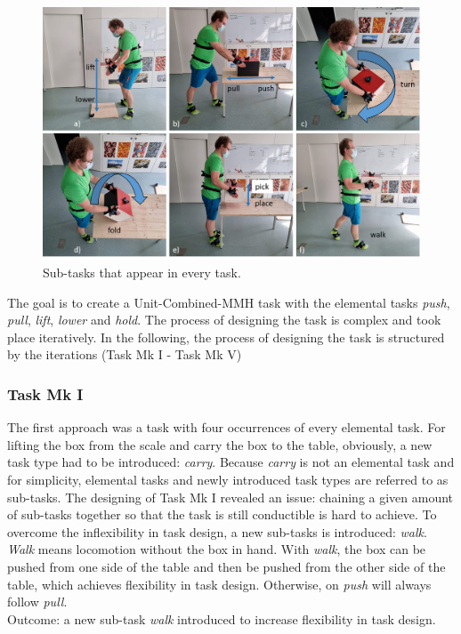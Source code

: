 \begin{figure}[H]
	\centering
	\includegraphics[width=\textwidth]{figures/sub-tasks.png}
	\caption[Description of sub-tasks]{Sub-tasks that appear in every task.}
	\label{fig:sub-tasks}
\end{figure}

The goal is to create a Unit-Combined-MMH task with the elemental tasks \textit{push}, \textit{pull}, \textit{lift}, \textit{lower} and \textit{hold}. The process of designing the task is complex and took place iteratively. In the following, the process of designing the task is structured by the iterations (Task Mk I - Task Mk V)\\

\subsubsection{Task Mk I}
The first approach was a task with four occurrences of every elemental task. For lifting the box from the scale and carry the box to the table, obviously, a new task type had to be introduced: \textit{carry}. Because \textit{carry} is not an elemental task and for simplicity, elemental tasks and newly introduced task types are referred to as sub-tasks. The designing of Task Mk I revealed an issue: chaining a given amount of sub-tasks together so that the task is still conductible is hard to achieve. To overcome the inflexibility in task design, a new sub-tasks is introduced: \textit{walk}. \textit{Walk} means locomotion without the box in hand. With \textit{walk}, the box can be pushed from one side of the table and then be pushed from the other side of the table, which achieves flexibility in task design. Otherwise, on \textit{push} will always follow \textit{pull}.\\
Outcome: a new sub-task \textit{walk} introduced to increase flexibility in task design.

